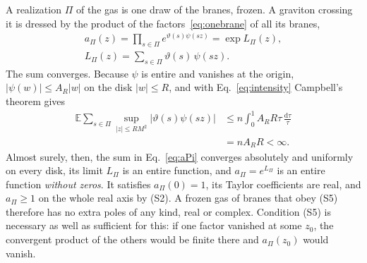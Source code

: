\documentclass[aps,prd,10pt,twocolumn,superscriptaddress,nofootinbib,floatfix,longbibliography]{revtex4-2}
\newcommand{\bE}{\mathbb{E}}
\newcommand{\dd}{\mathrm{d}}
\begin{document}
A realization $\Pi$ of the gas is one draw of the branes, frozen. A graviton crossing it is dressed by the product of the factors~\eqref{eq:onebrane} of all its branes,
\begin{equation}
\label{eq:aPi}
\begin{gathered}
a_\Pi(z)=\prod_{s\in\Pi}e^{\vartheta(s)\psi(sz)}=\exp L_\Pi(z),\\
L_\Pi(z)=\sum_{s\in\Pi}\vartheta(s)\,\psi(sz).
\end{gathered}
\end{equation}
The sum converges. Because $\psi$ is entire and vanishes at the origin, $|\psi(w)|\le A_R|w|$ on the disk $|w|\le R$, and with Eq.~\eqref{eq:intensity} Campbell's theorem gives
\[
\begin{aligned}
\bE\sum_{s\in\Pi}\sup_{|z|\le RM^2}\bigl|\vartheta(s)\psi(sz)\bigr|&\le n\int_0^1A_RR\tau\,\frac{\dd\tau}\tau\\
&=nA_RR<\infty .
\end{aligned}
\]
Almost surely, then, the sum in Eq.~\eqref{eq:aPi} converges absolutely and uniformly on every disk, its limit $L_\Pi$ is an entire function, and $a_\Pi=e^{L_\Pi}$ is an entire function \emph{without zeros}. It satisfies $a_\Pi(0)=1$, its Taylor coefficients are real, and $a_\Pi\ge1$ on the whole real axis by (S2). A frozen gas of branes that obey (S5) therefore has no extra poles of any kind, real or complex. Condition (S5) is necessary as well as sufficient for this: if one factor vanished at some $z_0$, the convergent product of the others would be finite there and $a_\Pi(z_0)$ would vanish.
\end{document}
